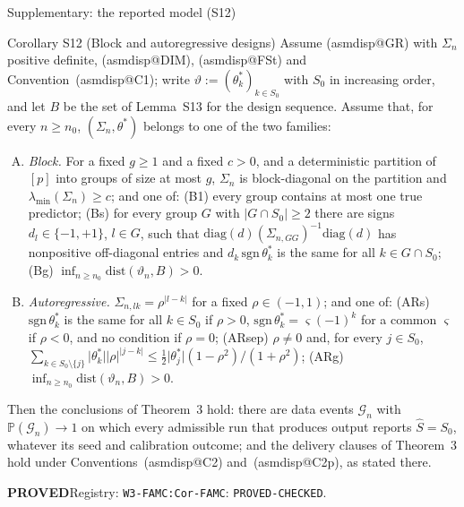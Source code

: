 \documentclass[aspectratio=169]{beamer}
\makeatletter
\newcommand{\asmdisp}[1]{\csname asmdisp@#1\endcsname}
\newcommand{\as}[1]{\textup{(\asmdisp{#1})}}
\newcommand{\set}[1]{[#1]}
\newcommand{\abs}[1]{\lvert #1\rvert}
\renewcommand{\P}{\mathbb{P}}
\newcommand{\lmin}{\lambda_{\min}}
\newcommand{\tstar}{\theta^*}
\newcommand{\Sz}{S_0}
\newcommand{\Sig}{\Sigma_n}
\newcommand{\Shat}{\hat S}
\newcommand{\rid}[1]{\texttt{#1}}
\makeatother
\begin{document}
\begin{frame}{Supplementary: the reported model (S12)}
\footnotesize
\begin{block}{Corollary S12 (Block and autoregressive designs)}
Assume \as{GR} with $\Sig$ positive definite, \as{DIM}, \as{FSt} and Convention~\as{C1}; write
$\vartheta:=(\theta^*_k)_{k\in\Sz}$ with $\Sz$ in increasing order, and let $B$ be the set of Lemma~S13 for the
design sequence. Assume that, for every $n\ge n_0$, $(\Sig,\tstar)$ belongs to one of the two families:
\begin{enumerate}[(A)]
  \item \emph{Block.} For a fixed $g\ge1$ and a fixed $c>0$, and a deterministic partition of $\set p$ into groups of size at
    most $g$, $\Sig$ is block-diagonal on the partition and $\lmin(\Sig)\ge c$; and one of: (B1) every group contains at
    most one true predictor; (Bs) for every group $G$ with $\abs{G\cap\Sz}\ge2$ there are signs $d_l\in\{-1,+1\}$, $l\in G$,
    such that $\mathrm{diag}(d)(\Sigma_{n,GG})^{-1}\mathrm{diag}(d)$ has nonpositive off-diagonal entries and
    $d_k\,\mathrm{sgn}\,\theta^*_k$ is the same for all $k\in G\cap\Sz$; (Bg) $\inf_{n\ge n_0}\mathrm{dist}(\vartheta_n,B)>0$.
  \item \emph{Autoregressive.} $\Sigma_{n,lk}=\rho^{\abs{l-k}}$ for a fixed $\rho\in(-1,1)$; and one of: (ARs)
    $\mathrm{sgn}\,\theta^*_k$ is the same for all $k\in\Sz$ if $\rho>0$, $\mathrm{sgn}\,\theta^*_k=\varsigma(-1)^k$ for a
    common $\varsigma$ if $\rho<0$, and no condition if $\rho=0$; (ARsep) $\rho\neq0$ and, for every $j\in\Sz$,
    $\sum_{k\in\Sz\setminus\{j\}}\abs{\theta^*_k}\abs\rho^{\abs{j-k}}\le\tfrac12\abs{\theta^*_j}(1-\rho^2)/(1+\rho^2)$; (ARg)
    $\inf_{n\ge n_0}\mathrm{dist}(\vartheta_n,B)>0$.
\end{enumerate}
Then the conclusions of Theorem~3 hold: there are data events $\mathcal G_n$ with $\P(\mathcal G_n)\to1$
on which every admissible run that produces output reports $\Shat=\Sz$, whatever its seed and calibration outcome; and
the delivery clauses of Theorem~3 hold under Conventions~\as{C2} and~\as{C2p}, as stated there.
\end{block}
{\footnotesize \textbf{PROVED}\quad Registry: \rid{W3-FAMC:Cor-FAMC}: \rid{PROVED-CHECKED}.}

\end{frame}
\end{document}
